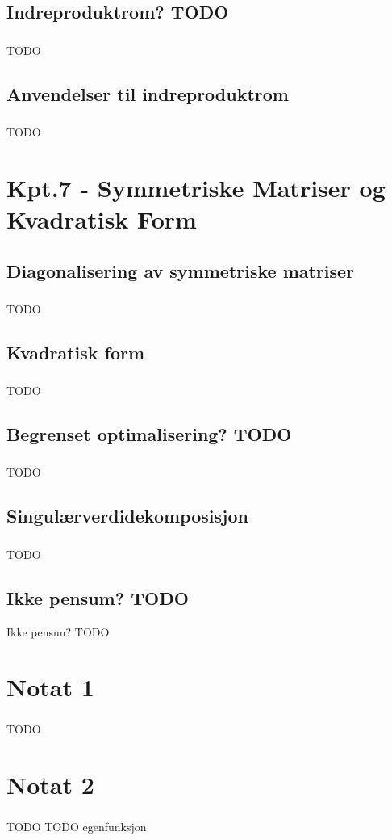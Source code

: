 \documentclass{article}
\begin{document}
    \subsection{Indreproduktrom? TODO}
      \subsubsection{}
        TODO
    \subsection{Anvendelser til indreproduktrom}
      \subsubsection{}
        TODO
  \section{Kpt.7 - Symmetriske Matriser og Kvadratisk Form}
    \subsection{Diagonalisering av symmetriske matriser}
      \subsubsection{}
        TODO
    \subsection{Kvadratisk form}
      \subsubsection{}
        TODO
    \subsection{Begrenset optimalisering? TODO}
      \subsubsection{}
        TODO
    \subsection{Singulærverdidekomposisjon}
      \subsubsection{}
        TODO
    \subsection{Ikke pensum? TODO}
      Ikke pensun? TODO
  \section{Notat 1}
    \subsubsection{}
      TODO
  \section{Notat 2}
    \subsubsection{}
      TODO
  TODO egenfunksjon
\end{document}
